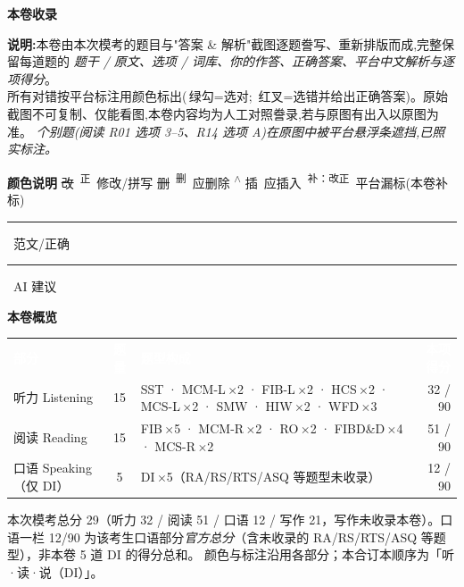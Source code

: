 \documentclass[11pt]{article}
\newcommand{\fix}[2]{%
  \colorbox{cWrongBg}{\textcolor{cWrong}{\sout{#1}}}%
  \,\textsuperscript{\textcolor{cFix}{\footnotesize #2}}}
\newcommand{\del}[1]{%
  \colorbox{cDelBg}{\textcolor{cDelete}{\sout{#1}}}%
  \,\textsuperscript{\textcolor{cDelete}{\footnotesize 删}}}
\newcommand{\ins}[1]{%
  \textsuperscript{\textcolor{cInsert}{\footnotesize $\wedge$}}%
  \colorbox{cInsBg}{\textcolor{cInsert}{#1}}}
\newcommand{\add}[2]{%
  \textcolor{cAdd}{\uwave{#1}}%
  \,\textsuperscript{\textcolor{cAdd}{\footnotesize 补：#2}}}
\newcommand{\rok}[1]{{\color{cFix}\ding{51}\,#1}}                 %
\newcommand{\ptelegend}{%
  \begin{tcolorbox}[enhanced, colback=cGrayBox, colframe=cRule, boxrule=0.5pt,
    arc=2pt, left=10pt, right=10pt, top=6pt, bottom=6pt]
  {\bfseries\color{cHead}颜色说明\quad}
  \fix{改}{正}~修改/拼写\quad
  \del{删}~应删除\quad
  \ins{插}~应插入\quad
  \add{补}{改正}~平台漏标(本卷补标)\quad
  {\color{cFix}\rule{1em}{0.6em}}~范文/正确\quad
  {\color{cNote}\rule{1em}{0.6em}}~AI 建议
  \end{tcolorbox}}
\begin{document}
\begin{titlepage}
\vspace{0.8cm}

\begin{tcolorbox}[width=0.84\textwidth, enhanced, colback=cModelBg, colframe=cFix,
  boxrule=0pt, borderline west={3pt}{0pt}{cFix}, arc=3pt, left=14pt, right=14pt, top=8pt, bottom=8pt]
{\bfseries\color{cHead}本卷收录}
\end{tcolorbox}

\vfill
\begin{flushleft}\small\color{gray}
\textbf{说明:}本卷由本次模考的题目与"答案 \& 解析"截图逐题誊写、重新排版而成,完整保留每道题的
\emph{题干 / 原文、选项 / 词库、你的作答、正确答案、平台中文解析与逐项得分}。\\
所有对错按平台标注用颜色标出(\rok{绿勾}=选对; {\color{cWrong}}\,红叉=选错并给出正确答案)。原始截图不可复制、仅能看图,本卷内容均为人工对照誊录,若与原图有出入以原图为准。
\emph{个别题(阅读 R01 选项 3--5、R14 选项 A)在原图中被平台悬浮条遮挡,已照实标注。}
\end{flushleft}
\vspace{4mm}
\ptelegend
\end{titlepage}

\clearpage
\tableofcontents
\bigskip

{\large\bfseries\color{cAccent}本卷概览}\par\smallskip
{\small
\begin{tabularx}{\linewidth}{@{}l c >{\RaggedRight\arraybackslash}X r@{}}
\rowcolor{cHead}\textcolor{white}{\bfseries 部分} & \textcolor{white}{\bfseries 题量} & \textcolor{white}{\bfseries 题型构成} & \textcolor{white}{\bfseries 本项得分}\\
听力 Listening & 15 & SST · MCM-L\,$\times$2 · FIB-L\,$\times$2 · HCS\,$\times$2 · MCS-L\,$\times$2 · SMW · HIW\,$\times$2 · WFD\,$\times$3 & 32 / 90\\
阅读 Reading & 15 & FIB\,$\times$5 · MCM-R\,$\times$2 · RO\,$\times$2 · FIBD\&D\,$\times$4 · MCS-R\,$\times$2 & 51 / 90\\
口语 Speaking（仅 DI）& \phantom{0}5 & DI\,$\times$5（RA/RS/RTS/ASQ 等题型未收录）& 12 / 90\phantom{$^*$}\\
\end{tabularx}}
\par\smallskip
{\footnotesize\color{gray}本次模考总分 29（听力 32 / 阅读 51 / 口语 12 / 写作 21，写作未收录本卷）。口语一栏
12/90 为该考生口语部分\emph{官方总分}（含未收录的 RA/RS/RTS/ASQ 等题型），非本卷 5 道 DI 的得分总和。
颜色与标注沿用各部分；本合订本顺序为「听·读·说（DI）」。}
\end{document}
